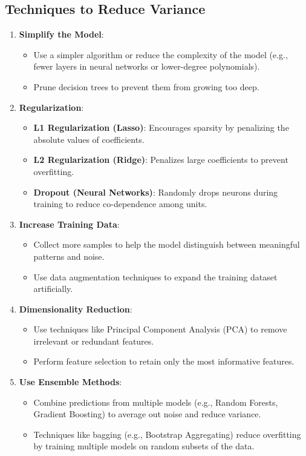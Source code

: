 \subsection*{Techniques to Reduce Variance}
\begin{enumerate}
    \item \textbf{Simplify the Model}:
    \begin{itemize}
        \item Use a simpler algorithm or reduce the complexity of the model (e.g., fewer layers in neural networks or lower-degree polynomials).
        \item Prune decision trees to prevent them from growing too deep.
    \end{itemize}

    \item \textbf{Regularization}:
    \begin{itemize}
        \item \textbf{L1 Regularization (Lasso)}: Encourages sparsity by penalizing the absolute values of coefficients.
        \item \textbf{L2 Regularization (Ridge)}: Penalizes large coefficients to prevent overfitting.
        \item \textbf{Dropout (Neural Networks)}: Randomly drops neurons during training to reduce co-dependence among units.
    \end{itemize}

    \item \textbf{Increase Training Data}:
    \begin{itemize}
        \item Collect more samples to help the model distinguish between meaningful patterns and noise.
        \item Use data augmentation techniques to expand the training dataset artificially.
    \end{itemize}

    \item \textbf{Dimensionality Reduction}:
    \begin{itemize}
        \item Use techniques like Principal Component Analysis (PCA) to remove irrelevant or redundant features.
        \item Perform feature selection to retain only the most informative features.
    \end{itemize}

    \item \textbf{Use Ensemble Methods}:
    \begin{itemize}
        \item Combine predictions from multiple models (e.g., Random Forests, Gradient Boosting) to average out noise and reduce variance.
        \item Techniques like bagging (e.g., Bootstrap Aggregating) reduce overfitting by training multiple models on random subsets of the data.
    \end{itemize}


\end{enumerate}
